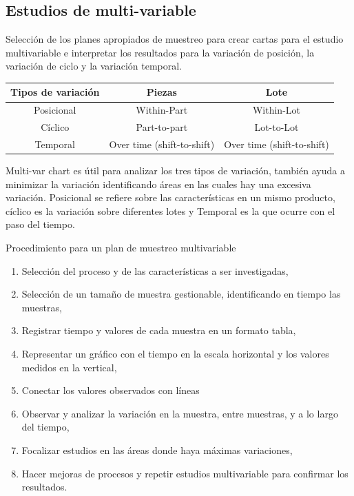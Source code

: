 \documentclass[]{article}
\begin{document}
\subsection{Estudios de multi-variable}

Selección de los planes apropiados de muestreo para crear cartas para el estudio multivariable e interpretar los resultados para la variación de posición, la variación de ciclo y la variación temporal.

\begin{tabular}{|c|c|c|}
	\hline Tipos de variación & Piezas & Lote \\ 
	\hline Posicional & Within-Part & Within-Lot \\ 
	\hline Cíclico & Part-to-part & Lot-to-Lot \\ 
	\hline Temporal & Over time (shift-to-shift) & Over time (shift-to-shift) \\ 
	\hline 
\end{tabular} 

Multi-var chart es útil para analizar los tres tipos de variación, también ayuda a minimizar la variación identificando áreas en las cuales hay una excesiva variación.
Posicional se refiere sobre las características en un mismo producto, cíclico es la variación sobre diferentes lotes y Temporal es la que ocurre con el paso del tiempo.


Procedimiento para un plan de muestreo multivariable

\begin{enumerate}
	\item Selección del proceso y de las características a ser investigadas,
	\item Selección de un tamaño de muestra gestionable, identificando en tiempo las muestras,
	\item Registrar tiempo y valores de cada muestra en un formato tabla,
	\item Representar un gráfico con el tiempo en la escala horizontal y los valores medidos en la vertical,
	\item Conectar los valores observados con líneas
	\item Observar y analizar la variación en la muestra, entre muestras, y a lo largo del tiempo,
	\item Focalizar estudios en las áreas donde haya máximas variaciones,
	\item Hacer mejoras de procesos y repetir estudios multivariable para confirmar los resultados.
\end{enumerate}
\end{document}
